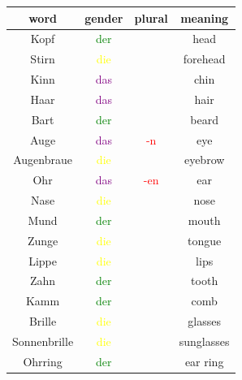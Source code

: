 \begin{center}
    \begin{tabular}{|c|c|c|c|}
        \hline
        \rowcolor{gray}
        word         & gender                  & plural               & meaning    \\
        \hline
        Kopf         & \textcolor{green}{der}  &                      & head       \\
        Stirn        & \textcolor{yellow}{die} &                      & forehead   \\
        Kinn         & \textcolor{purple}{das} &                      & chin       \\
        Haar         & \textcolor{purple}{das} &                      & hair       \\
        Bart         & \textcolor{green}{der}  &                      & beard      \\
        \hline
        Auge         & \textcolor{purple}{das} & \textcolor{red}{-n}  & eye        \\
        Augenbraue   & \textcolor{yellow}{die} &                      & eyebrow    \\
        Ohr          & \textcolor{purple}{das} & \textcolor{red}{-en} & ear        \\
        Nase         & \textcolor{yellow}{die} &                      & nose       \\
        Mund         & \textcolor{green}{der}  &                      & mouth      \\
        Zunge        & \textcolor{yellow}{die} &                      & tongue     \\
        \hline
        Lippe        & \textcolor{yellow}{die} &                      & lips       \\
        Zahn         & \textcolor{green}{der}  &                      & tooth      \\
        \hline
        Kamm         & \textcolor{green}{der}  &                      & comb       \\
        Brille       & \textcolor{yellow}{die} &                      & glasses    \\
        Sonnenbrille & \textcolor{yellow}{die} &                      & sunglasses \\
        Ohrring      & \textcolor{green}{der}  &                      & ear ring   \\
        \hline
    \end{tabular}
\end{center}

